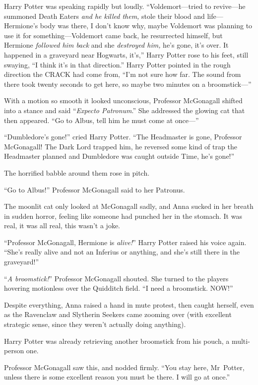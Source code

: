 Harry Potter was speaking rapidly but loudly. “Voldemort—tried to revive—he
summoned Death Eaters \emph{and he killed them,} stole their blood and
life—Hermione’s body was there, I don’t know why, maybe Voldemort was
planning to use it for something—Voldemort came back, he resurrected himself,
but Hermione \emph{followed him back} and she \emph{destroyed him,} he’s gone,
it’s over. It happened in a graveyard near Hogwarts, it’s,” Harry Potter rose
to his feet, still swaying, “I think it’s in that direction.” Harry Potter
pointed in the rough direction the CRACK had come from, “I’m not sure how far.
The sound from there took twenty seconds to get here, so maybe two minutes on a
broomstick—”

With a motion so smooth it looked unconscious, Professor McGonagall shifted
into a stance and said “\emph{Expecto Patronum}.” She addressed the
glowing cat that then appeared. “Go to Albus, tell him he must come at once—”

“Dumbledore’s gone!” cried Harry Potter. “The Headmaster is gone, Professor
McGonagall! The Dark Lord trapped him, he reversed some kind of trap the
Headmaster planned and Dumbledore was caught outside Time, he’s gone!”

The horrified babble around them rose in pitch.

“Go to Albus!” Professor McGonagall said to her Patronus.

The moonlit cat only looked at McGonagall sadly, and Anna sucked in her breath
in sudden horror, feeling like someone had punched her in the stomach. It was
real, it was all real, this wasn’t a joke.

“Professor McGonagall, Hermione is \emph{alive!}” Harry Potter raised his voice
again. “She’s really alive and not an Inferius or anything, and she’s still
there in the graveyard!”

“\emph{A broomstick!}” Professor McGonagall shouted. She turned to the players
hovering motionless over the Quidditch field. “I need a broomstick. NOW!”

Despite everything, Anna raised a hand in mute protest, then caught herself,
even as the Ravenclaw and Slytherin Seekers came zooming over (with excellent
strategic sense, since they weren’t actually doing anything).

Harry Potter was already retrieving another broomstick from his pouch, a
multi-person one.

Professor McGonagall saw this, and nodded firmly. “You stay here, Mr~Potter,
unless there is some excellent reason you must be there. I will go at once.”

